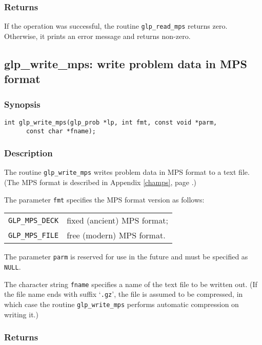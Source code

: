 \subsubsection*{Returns}

If the operation was successful, the routine \verb|glp_read_mps|
returns zero. Otherwise, it prints an error message and returns
non-zero.

\subsection{glp\_write\_mps: write problem data in MPS format}

\subsubsection*{Synopsis}

\begin{verbatim}
int glp_write_mps(glp_prob *lp, int fmt, const void *parm,
      const char *fname);
\end{verbatim}

\subsubsection*{Description}

The routine \verb|glp_write_mps| writes problem data in MPS format to a
text file. (The MPS format is described in Appendix \ref{champs}, page
\pageref{champs}.)

The parameter \verb|fmt| specifies the MPS format version as follows:

\begin{tabular}{@{}ll}
\verb|GLP_MPS_DECK| & fixed (ancient) MPS format; \\
\verb|GLP_MPS_FILE| & free (modern) MPS format. \\
\end{tabular}

The parameter \verb|parm| is reserved for use in the future and must be
specified as \verb|NULL|.

The character string \verb|fname| specifies a name of the text file to
be written out. (If the file name ends with suffix `\verb|.gz|', the
file is assumed to be compressed, in which case the routine
\verb|glp_write_mps| performs automatic compression on writing it.)

\subsubsection*{Returns}

